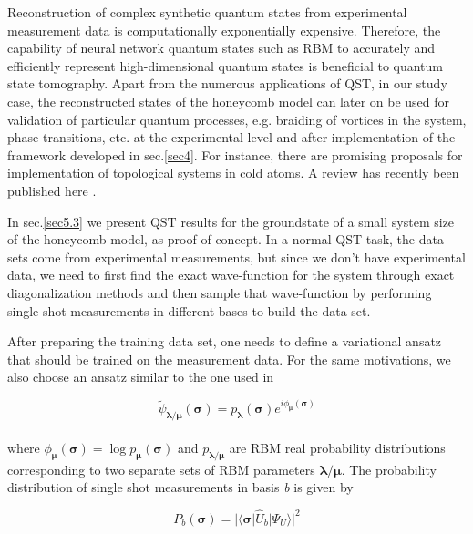 \documentclass{article}
\begin{document}
Reconstruction of complex synthetic quantum states from experimental measurement data is computationally exponentially expensive. Therefore, the capability of neural network quantum states such as RBM to accurately and efficiently represent high-dimensional quantum states is beneficial to quantum state tomography. Apart from the numerous applications of QST, in our study case, the reconstructed states of the honeycomb model can later on be used for validation of particular quantum processes, e.g. braiding of vortices in the system, phase transitions, etc. at the experimental level and after implementation of the framework developed in sec.\hspace{0.2mm}\ref{sec4}. For instance, there are promising proposals for implementation of topological systems in cold atoms. A review has recently been published here \cite{coldatom}. 

In sec.\hspace{0.2mm}\ref{sec5.3} we present QST results for the groundstate of a small system size of the honeycomb model, as proof of concept. In a normal QST task, the data sets come from experimental measurements, but since we don't have experimental data, we need to first find the exact wave-function for the system through exact diagonalization methods and then sample that wave-function by performing single shot measurements in different bases to build the data set. 

After preparing the training data set, one needs to define a variational ansatz that should be trained on the measurement data. For the same motivations, we also choose an ansatz similar to the one used in \cite{Torlai_2018}

\begin{equation}\label{eq:19_2}
        \tilde \psi_{\boldsymbol{\lambda/\mu}} (\boldsymbol{\sigma})  =  p_{\boldsymbol{\lambda}}(\boldsymbol{\sigma}) e^{i \phi_{\boldsymbol{\mu}}(\boldsymbol{\sigma})}
\end{equation}\\

where $\phi_{\boldsymbol{\mu}}(\boldsymbol{\sigma}) = \log p_{\boldsymbol{\mu}}(\boldsymbol{\sigma})$ and $p_{\boldsymbol{\lambda/\mu}}$ are RBM real probability distributions corresponding to two separate sets of RBM parameters $\boldsymbol{\lambda/\mu}$. The probability distribution of single shot measurements in basis \textit{b} is given by 

\begin{equation}\label{eq:19_3}
        P_{b}(\boldsymbol{\sigma}) = | \langle \boldsymbol{\sigma}| \hat{U}_{b} |\Psi_{U}\rangle|^{2}
\end{equation}\\
\end{document}
